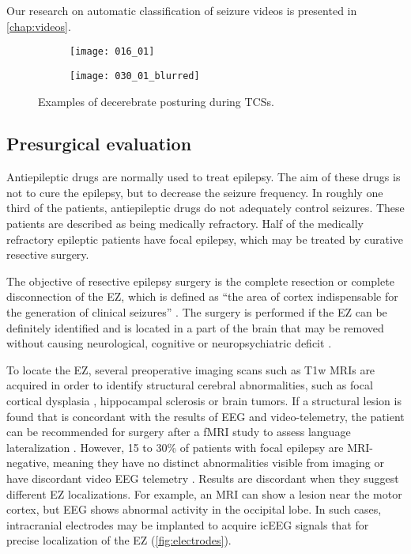 Our research on automatic classification of seizure videos is presented in \cref{chap:videos}.

\begin{figure}
  \centering

  \begin{subfigure}{0.49\linewidth}
    \texttt{[image: 016\_01]}
  \end{subfigure}
  \begin{subfigure}{0.49\linewidth}
    \texttt{[image: 030\_01\_blurred]}
  \end{subfigure}
  \caption[Examples of decerebrate posturing]{
    Examples of decerebrate posturing during \acp{TCS}.
  }
  \label{fig:decerebration}
\end{figure}


\subsection{Presurgical evaluation}

Antiepileptic drugs are normally used to treat epilepsy.
The aim of these drugs is not to cure the epilepsy, but to decrease the seizure frequency.
In roughly one third of the patients, antiepileptic drugs do not adequately control seizures.
These patients are described as being medically refractory.
Half of the medically refractory epileptic patients have focal epilepsy, which may be treated by curative resective surgery.

The objective of resective epilepsy surgery is the complete resection or complete disconnection of the \ac{EZ}, which is defined as ``the area of cortex indispensable for the generation of clinical seizures'' \cite{rosenow_presurgical_2001}.
The surgery is performed if the \ac{EZ} can be definitely identified and is located in a part of the brain that may be removed without causing neurological, cognitive or neuropsychiatric deficit \cite{jobst_resective_2015}.

To locate the \ac{EZ}, several preoperative imaging scans such as \ac{T1w} \acp{MRI} are acquired in order to identify structural cerebral abnormalities, such as focal cortical dysplasia \cite{kabat_focal_2012}, hippocampal sclerosis \cite{thom_review_2014} or brain tumors.
If a structural lesion is found that is concordant with the results of \ac{EEG} and video-telemetry, the patient can be recommended for surgery after a \ac{fMRI} study to assess language lateralization \cite{duncan_brain_2016}.
However, 15 to 30\% of patients with focal epilepsy are \ac{MRI}-negative, meaning they have no distinct abnormalities visible from imaging or have discordant video \ac{EEG} telemetry \cite{bien_characteristics_2009}.
Results are discordant when they suggest different \ac{EZ} localizations.
For example, an \ac{MRI} can show a lesion near the motor cortex, but \ac{EEG} shows abnormal activity in the occipital lobe.
In such cases, intracranial electrodes may be implanted to acquire \ac{icEEG} signals that for precise localization of the \ac{EZ} (\cref{fig:electrodes}).

